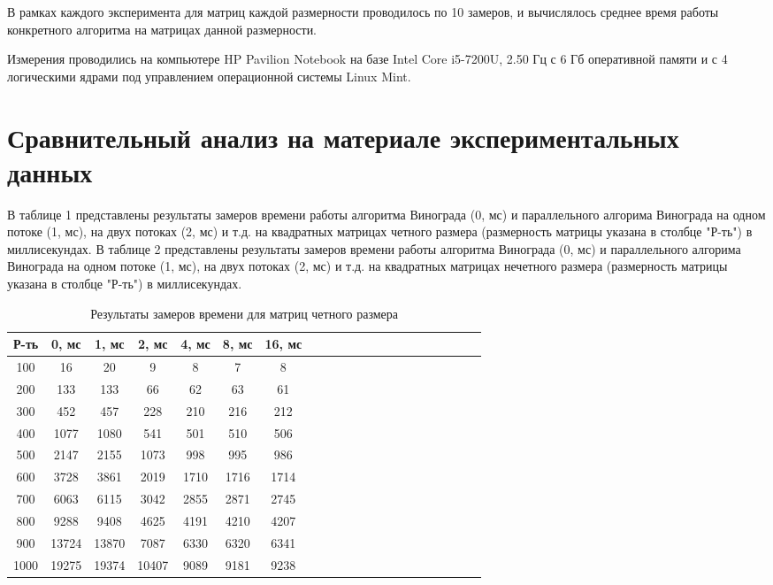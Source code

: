 \documentclass[a4paper,14pt]{report}
\begin{document}
В рамках каждого эксперимента для матриц каждой размерности проводилось по 10 замеров, и вычислялось среднее время работы конкретного алгоритма на матрицах данной размерности.

Измерения проводились на компьютере HP Pavilion Notebook на базе Intel Core i5-7200U, 2.50 Гц с 6 Гб оперативной памяти и с 4 логическими ядрами под управлением операционной системы Linux Mint.

\section*{Сравнительный анализ на материале экспериментальных данных}

В таблице 1 представлены результаты замеров времени работы алгоритма Винограда (0, мс) и параллельного алгорима Винограда на одном потоке (1, мс), на двух потоках (2, мс) и т.д. на квадратных матрицах четного размера (размерность матрицы указана в столбце "Р-ть") в миллисекундах.
В таблице 2 представлены результаты замеров времени работы алгоритма Винограда (0, мс) и параллельного алгорима Винограда на одном потоке (1, мс), на двух потоках (2, мс) и т.д. на квадратных матрицах нечетного размера (размерность матрицы указана в столбце "Р-ть") в миллисекундах.

\begin{table}
	\caption{Результаты замеров времени для матриц четного размера}
	\tabcolsep=0.11cm
		\begin{tabular}{|c | c | c | c | c | c | c | c | c | c | c | c | c | c | c | c | c | c | c | c | c |}
	 	\hline
		Р-ть & 0, мс & 1, мс & 2, мс & 4, мс & 8, мс & 16, мс \\ [0.5ex]
	 	\hline\hline
		100 & 16 & 20 & 9 & 8 & 7 & 8 \\ \hline
		200 & 133 & 133 & 66 & 62 & 63 & 61 \\ \hline
		300 & 452 & 457 & 228 & 210 & 216 & 212 \\ \hline
		400 & 1077 & 1080 & 541 & 501 & 510 & 506 \\ \hline
		500 & 2147 & 2155 & 1073 & 998 & 995 & 986 \\ \hline
		600 & 3728 & 3861 & 2019 & 1710 & 1716 & 1714 \\ \hline
		700 & 6063 & 6115 & 3042 & 2855 & 2871 & 2745 \\ \hline
		800 & 9288 & 9408 & 4625 & 4191 & 4210 & 4207 \\ \hline
		900 & 13724 & 13870 & 7087 & 6330 & 6320 & 6341 \\ \hline
		1000 & 19275 & 19374 & 10407 & 9089 & 9181 & 9238 \\ \hline
	\end{tabular}
\end{table}
\end{document}
